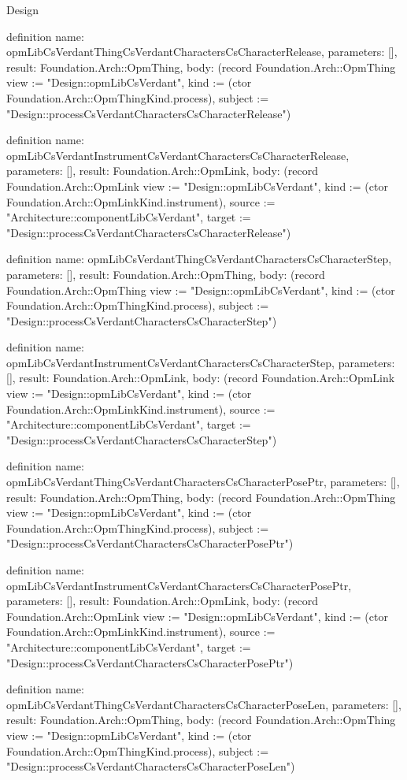 \begin{lexlean}{Design}
\begin{semanticmodule}
definition{
  name: opmLibCsVerdantThingCsVerdantCharactersCsCharacterRelease,
  parameters: [],
  result: Foundation.Arch::OpmThing,
  body: (record Foundation.Arch::OpmThing {view := "Design::opmLibCsVerdant", kind := (ctor Foundation.Arch::OpmThingKind.process), subject := "Design::processCsVerdantCharactersCsCharacterRelease"})
}

definition{
  name: opmLibCsVerdantInstrumentCsVerdantCharactersCsCharacterRelease,
  parameters: [],
  result: Foundation.Arch::OpmLink,
  body: (record Foundation.Arch::OpmLink {view := "Design::opmLibCsVerdant", kind := (ctor Foundation.Arch::OpmLinkKind.instrument), source := "Architecture::componentLibCsVerdant", target := "Design::processCsVerdantCharactersCsCharacterRelease"})
}

definition{
  name: opmLibCsVerdantThingCsVerdantCharactersCsCharacterStep,
  parameters: [],
  result: Foundation.Arch::OpmThing,
  body: (record Foundation.Arch::OpmThing {view := "Design::opmLibCsVerdant", kind := (ctor Foundation.Arch::OpmThingKind.process), subject := "Design::processCsVerdantCharactersCsCharacterStep"})
}

definition{
  name: opmLibCsVerdantInstrumentCsVerdantCharactersCsCharacterStep,
  parameters: [],
  result: Foundation.Arch::OpmLink,
  body: (record Foundation.Arch::OpmLink {view := "Design::opmLibCsVerdant", kind := (ctor Foundation.Arch::OpmLinkKind.instrument), source := "Architecture::componentLibCsVerdant", target := "Design::processCsVerdantCharactersCsCharacterStep"})
}

definition{
  name: opmLibCsVerdantThingCsVerdantCharactersCsCharacterPosePtr,
  parameters: [],
  result: Foundation.Arch::OpmThing,
  body: (record Foundation.Arch::OpmThing {view := "Design::opmLibCsVerdant", kind := (ctor Foundation.Arch::OpmThingKind.process), subject := "Design::processCsVerdantCharactersCsCharacterPosePtr"})
}

definition{
  name: opmLibCsVerdantInstrumentCsVerdantCharactersCsCharacterPosePtr,
  parameters: [],
  result: Foundation.Arch::OpmLink,
  body: (record Foundation.Arch::OpmLink {view := "Design::opmLibCsVerdant", kind := (ctor Foundation.Arch::OpmLinkKind.instrument), source := "Architecture::componentLibCsVerdant", target := "Design::processCsVerdantCharactersCsCharacterPosePtr"})
}

definition{
  name: opmLibCsVerdantThingCsVerdantCharactersCsCharacterPoseLen,
  parameters: [],
  result: Foundation.Arch::OpmThing,
  body: (record Foundation.Arch::OpmThing {view := "Design::opmLibCsVerdant", kind := (ctor Foundation.Arch::OpmThingKind.process), subject := "Design::processCsVerdantCharactersCsCharacterPoseLen"})
}


\end{semanticmodule}
\end{lexlean}
